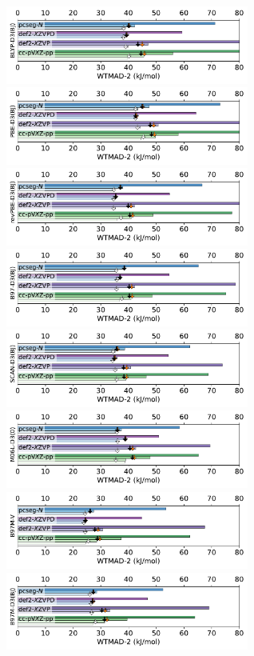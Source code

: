 \documentclass[12pt]{article}
\begin{document}
\begin{figure}[p]
    \centering
    \includegraphics[width=8cm]{../output/fig_gmtkn55_00.pdf}
    \includegraphics[width=8cm]{../output/fig_gmtkn55_01.pdf}
    \includegraphics[width=8cm]{../output/fig_gmtkn55_02.pdf}
    \includegraphics[width=8cm]{../output/fig_gmtkn55_03.pdf}
    \includegraphics[width=8cm]{../output/fig_gmtkn55_04.pdf}
    \includegraphics[width=8cm]{../output/fig_gmtkn55_05.pdf}
    \includegraphics[width=8cm]{../output/fig_gmtkn55_06.pdf}
    \includegraphics[width=8cm]{../output/fig_gmtkn55_07.pdf}

\end{figure}
\end{document}
